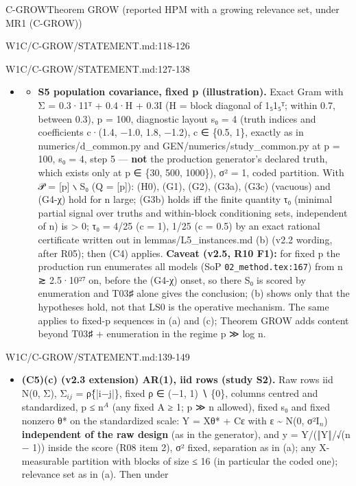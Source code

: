 \begin{card}{C-GROW}{Theorem GROW (reported HPM with a growing relevance set, under MR1 (C-GROW))}
\begin{stmt}{W1C/C-GROW/STATEMENT.md:118-126}
\end{stmt}
\begin{stmt}{W1C/C-GROW/STATEMENT.md:127-138}
\begin{itemize}
\item[] \begin{itemize}
\item[(b)] \textbf{S5 population covariance, fixed p (illustration).} Exact Gram with Σ = 0.3·11ᵀ + 0.4·H + 0.3I (H = block
diagonal of 1₅1₅ᵀ; within 0.7, between 0.3), p = 100, diagnostic layout s₀ = 4 (truth indices and coefficients
c·(1.4, −1.0, 1.8, −1.2), c ∈ \{0.5, 1\}, exactly as in numerics/d\_common.py and GEN/numerics/study\_common.py at
p = 100, s₀ = 4, step 5 — \textbf{not} the production generator's declared truth, which exists only at p ∈ \{30, 500,
1000\}), σ² = 1, coded partition. With 𝒫 = [p] ∖ S₀ (Q = [p]): (H0), (G1), (G2), (G3a), (G3c) (vacuous) and (G4-χ)
hold for n large; (G3b) holds iff the finite quantity τ₀ (minimal partial signal over truths and within-block
conditioning sets, independent of n) is > 0; τ₀ = 4/25 (c = 1), 1/25 (c = 0.5) by an exact rational certificate
written out in lemmas/L5\_instances.md (b) (v2.2 wording, after R05); then (C4) applies. \textbf{Caveat (v2.5, R10 F1):}
for fixed p the production run enumerates all models (SoP \texttt{02\_method.tex:167}) from n ≳ 2.5·10²⁷ on, before the
(G4-χ) onset, so there S₀ is scored by enumeration and T03♯ alone gives the conclusion; (b) shows only that the
hypotheses hold, not that LS0 is the operative mechanism. The same applies to fixed-p sequences in (a) and (c);
Theorem GROW adds content beyond T03♯ + enumeration in the regime p ≫ log n.
\end{itemize}
\end{itemize}
\end{stmt}
\begin{stmt}{W1C/C-GROW/STATEMENT.md:139-149}
\begin{itemize}
\item \textbf{(C5)(c) (v2.3 extension) AR(1), iid rows (study S2).} Raw rows iid N(0, Σ), Σ$_{ij}$ = ρ\^\{|i−j|\}, fixed
ρ ∈ (−1, 1) ∖ \{0\}, columns centred and standardized, p ≤ n$^{A}$ (any fixed A ≥ 1; p ≫ n allowed), fixed s₀ and fixed
nonzero θ* on the standardized scale: Y = Xθ* + Cε with ε \textasciitilde{} N(0, σ²I$_{n}$) \textbf{independent of the raw design} (as in
the generator), and y = Y/(‖Y‖/√(n − 1)) inside the score (R08 item 2), σ² fixed, separation as in (a); any
X-measurable partition with blocks of size ≤ 16 (in particular the coded one); relevance set as in (a). Then under

\end{itemize}
\end{stmt}
\end{card}
